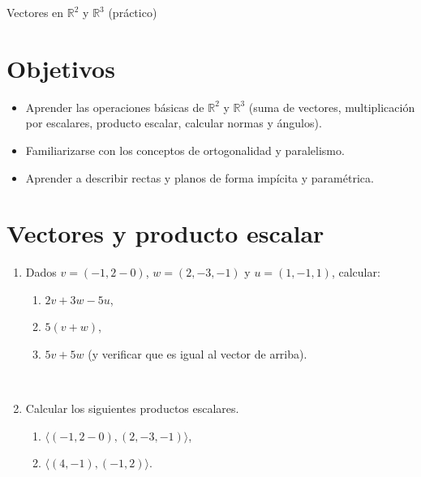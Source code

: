 \begin{chapter}{Vectores en $\mathbb R^2$ y $\mathbb R^3$ (práctico)}\label{practico-6}


\section*{Objetivos}

\begin{itemize}
 \item Aprender las operaciones básicas de $\mathbb R^2$ y $\mathbb R^3$ (suma de vectores, multiplicación por escalares, producto escalar, calcular normas y \'angulos).
 \item Familiarizarse con los conceptos de ortogonalidad y paralelismo.
 \item Aprender a describir rectas y planos de forma imp\'icita y param\'etrica.
\end{itemize}



\section*{Vectores y producto escalar}

\begin{enumerate}


\item Dados $v = (-1, 2-0)$, $w = (2,-3,-1)$ y $u = (1,-1,1)$, calcular:
\begin{enumerate}
	\item $2v + 3w -5u$,
	\item $5(v+w)$, 
	\item $5v + 5w$ (y verificar que es igual al vector de arriba).
\end{enumerate}

\

\item Calcular los siguientes productos escalares. %
\begin{enumerate}
  \item $\langle (-1, 2-0) ,(2,-3,-1) \rangle$, 
  \item  $\langle (4,-1),(-1,2) \rangle$.
\end{enumerate}


\end{enumerate}
\end{chapter}
